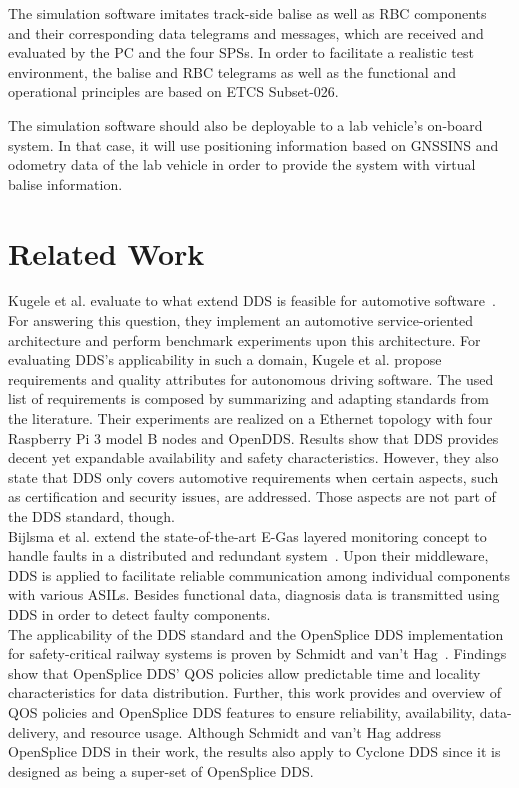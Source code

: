 \documentclass[a4paper, 12pt]{scrartcl}
\begin{document}
The simulation software imitates track-side balise as well as \gls*{RBC} components and their corresponding data telegrams and messages, which are received and evaluated by the PC and the four \glspl*{SPS}.
In order to facilitate a realistic test environment, the balise and \gls*{RBC} telegrams as well as the functional and operational principles are based on \gls*{ETCS} Subset-026.

The simulation software should also be deployable to a lab vehicle's on-board system.
In that case, it will use positioning information based on \gls*{GNSSINS} and odometry data of the lab vehicle in order to provide the system with virtual balise information.


\section*{Related Work}
Kugele et al. evaluate to what extend \gls*{DDS} is feasible for automotive software~\cite{KugeleDataCentricForAuto}.
For answering this question, they implement an automotive service-oriented architecture and perform benchmark experiments upon this architecture.
For evaluating \gls*{DDS}'s applicability in such a domain, Kugele et al. propose requirements and quality attributes for autonomous driving software.
The used list of requirements is composed by summarizing and adapting standards from the literature.
Their experiments are realized on a Ethernet topology with four Raspberry Pi 3 model B nodes and OpenDDS.
Results show that \gls*{DDS} provides decent yet expandable availability and safety characteristics.
However, they also state that \gls*{DDS} only covers automotive requirements when certain aspects, such as certification and security issues, are addressed.
Those aspects are not part of the \gls*{DDS} standard, though.
\\

Bijlsma et al. extend the state-of-the-art E-Gas layered monitoring concept to handle faults in a distributed and redundant system~\cite{DistributedSafety2020}.
Upon their middleware, \gls*{DDS} is applied to facilitate reliable communication among individual components with various \glspl*{ASIL}.
Besides functional data, diagnosis data is transmitted using \gls*{DDS} in order to detect faulty components.
\\

The applicability of the \gls*{DDS} standard and the OpenSplice DDS implementation for safety-critical railway systems is proven by Schmidt and van't Hag~\cite{SchmidtMissionCriticalChallenges}.
Findings show that OpenSplice DDS' \gls*{QOS} policies allow predictable time and locality characteristics for data distribution.
Further, this work provides and overview of \gls*{QOS} policies and OpenSplice DDS features to ensure reliability, availability, data-delivery, and resource usage.
Although Schmidt and van't Hag address OpenSplice DDS in their work, the results also apply to Cyclone DDS since it is designed as being a super-set of OpenSplice DDS.
\\
\end{document}
